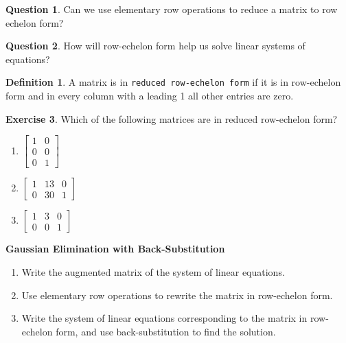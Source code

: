 \documentclass[handout]{beamer}
\theoremstyle{definition}
\newtheorem{exercise}{Exercise}
\newtheorem{question}[exercise]{Question}
\newtheorem*{defn}{Definition}
\renewcommand{\emph}[1]{{\color{blue}\texttt{#1}}}
\begin{document}
\begin{frame}{\insertframenumber}
	\begin{question}
		Can we use elementary row operations to reduce a matrix to row echelon form?
	\end{question}
	\begin{question}
		How will row-echelon form help us solve linear systems of equations?
	\end{question}
\end{frame}

\begin{frame}{\insertframenumber}
	\begin{defn}
		A matrix is in \emph{reduced row-echelon form} if it is in row-echelon form and in every column with a leading 1 all other entries are zero.
	\end{defn}
	\begin{exercise}
		Which of the following matrices are in reduced row-echelon form?
		\begin{enumerate}[label=(\alph*)]
			\item $\left[\begin{array}{rr}
			1 & 0 \\
			0 & 0 \\
			0 & 1
			\end{array}\right]$
			\item $\left[\begin{array}{rrr}
			1 & 13 & 0 \\
			0 & 30 & 1
			\end{array}\right]$
			\item$\left[\begin{array}{rrr}
				1 & 3 & 0 \\
				0 & 0 & 1
			\end{array}\right]$
		\end{enumerate}
	\end{exercise}
\end{frame}

\begin{frame}{\insertframenumber}
	\begin{block}{\textbf{Gaussian Elimination with Back-Substitution}}
		\begin{enumerate}[label=\arabic*.]
			\item Write the augmented matrix of the system of linear equations.
			\item Use elementary row operations to rewrite the matrix in row-echelon form.
			\item Write the system of linear equations corresponding to the matrix in row-echelon form, and use back-substitution to find the solution.
		\end{enumerate}
	\end{block}
\end{frame}
\end{document}
